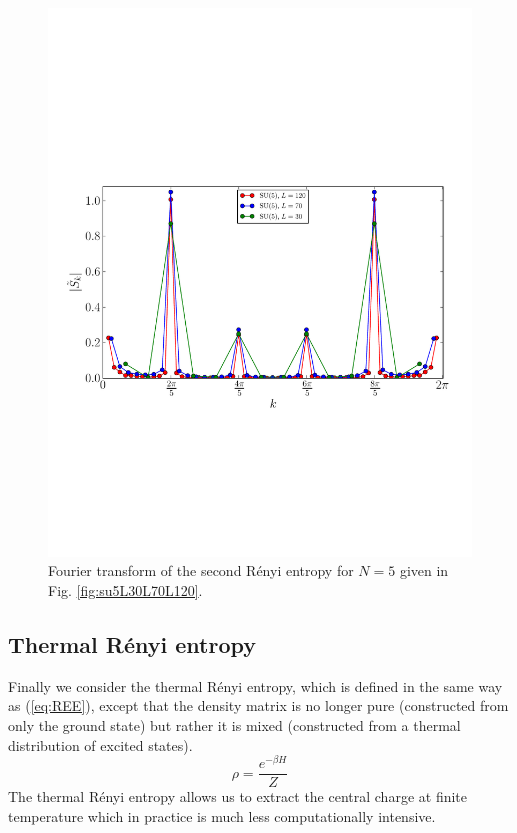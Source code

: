 \documentclass[aps,prb,reprint,floatfix]{revtex4-1}
\begin{document}
\begin{figure}
\centerline{\includegraphics[angle=0,width=1.0\columnwidth]{EE_fourierSu5L30L70L120.pdf}}
\caption{Fourier transform of the second R\'{e}nyi entropy for $N=5$ given in Fig. \ref{fig:su5L30L70L120}.}
\label{fig:EEfouriersu5}
\end{figure}
\subsection{Thermal R\'{e}nyi entropy} 
\label{subsec:thermalRE}
Finally we consider the thermal R\'{e}nyi entropy, which is defined in the same way as (\ref{eq:REE}), except that the density matrix is no longer pure (constructed from only the ground state) but rather it is mixed (constructed from a thermal distribution of excited states).  
{\allowdisplaybreaks
\begin{equation}
		\rho=\frac{e^{-\beta H}}{Z}
\label{eq:Rhothermal}
\end{equation}}
The thermal R\'{e}nyi entropy allows us to extract the central charge at finite temperature which in practice is much less computationally intensive.
\end{document}

